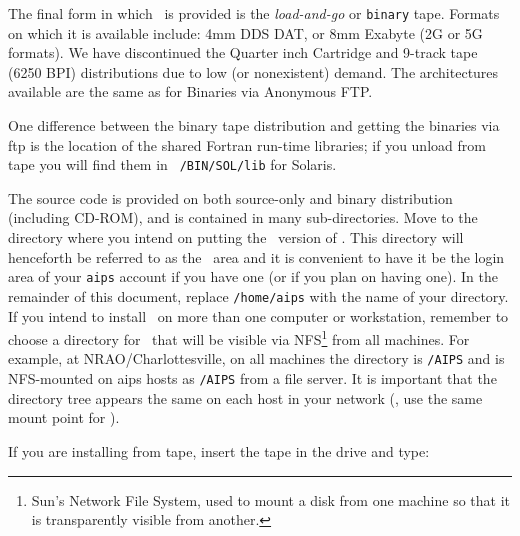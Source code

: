 \medskip{}

The final form in which \AIPS\ is provided is the {\it load-and-go\/} or
{\tt binary} tape.  Formats on which it is available include: 4mm DDS
DAT, or 8mm Exabyte (2G or 5G formats).  We have discontinued the
Quarter inch Cartridge and 9-track tape (6250 BPI) distributions due to
low (or nonexistent) demand.  The architectures available are the same
as for Binaries via Anonymous FTP.

One difference between the binary tape distribution and getting the
binaries via ftp is the location of the shared Fortran run-time
libraries; if you unload from tape you will find them in {\tt\AROOT
/BIN/SOL/lib} for Solaris.

\medskip{}

The source code is provided on both source-only and binary distribution
(including CD-ROM), and is contained in many sub-directories.  Move to
the directory where you intend on putting the \THISVER\ version of
\AIPS.  This directory will henceforth be referred to as the
\AROOT\ area and it is convenient to have it be the login area of your
{\tt aips} account if you have one (or if you plan on having one).  In
the remainder of this document, replace {\tt /home/aips} with the name
of your directory.  If you intend to install \AIPS\ on more than one
computer or workstation, remember to choose a directory for \AROOT\ that
will be visible via NFS\footnote*{\eightrm Sun's Network File System,
                                           used to mount a disk from one
					   machine so that it is
					   transparently visible from
					   another.}
from all machines.  For example, at NRAO/Charlottesville, on all
machines the directory is {\tt /AIPS} and is NFS-mounted on aips hosts
as {\tt /AIPS} from a file server.  It is important that the directory
tree appears the same on each host in your network (\ie, use the same
mount point for \AROOT).

If you are installing from tape, insert the tape in the drive and
type:\medskip

\medskip %

